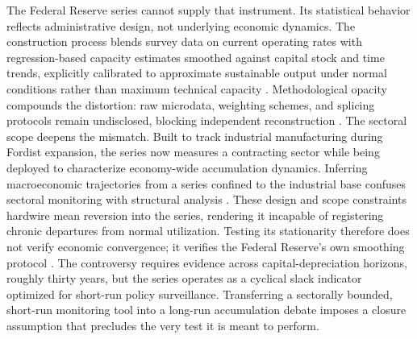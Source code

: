 \documentclass[11pt]{article}
\begin{document}
The Federal Reserve series cannot supply that instrument. Its statistical behavior reflects administrative design, not underlying economic dynamics. The construction process blends survey data on current operating rates with regression-based capacity estimates smoothed against capital stock and time trends, explicitly calibrated to approximate sustainable output under normal conditions rather than maximum technical capacity \citep{Shapiro1989}. Methodological opacity compounds the distortion: raw microdata, weighting schemes, and splicing protocols remain undisclosed, blocking independent reconstruction \citep{Shaikh2016}. The sectoral scope deepens the mismatch. Built to track industrial manufacturing during Fordist expansion, the series now measures a contracting sector while being deployed to characterize economy-wide accumulation dynamics. Inferring macroeconomic trajectories from a series confined to the industrial base confuses sectoral monitoring with structural analysis \citep{Haluska2023}. These design and scope constraints hardwire mean reversion into the series, rendering it incapable of registering chronic departures from normal utilization. Testing its stationarity therefore does not verify economic convergence; it verifies the Federal Reserve's own smoothing protocol \citep{Nikiforos2016, Nikiforos2021}. The controversy requires evidence across capital-depreciation horizons, roughly thirty years, but the series operates as a cyclical slack indicator optimized for short-run policy surveillance. Transferring a sectorally bounded, short-run monitoring tool into a long-run accumulation debate imposes a closure assumption that precludes the very test it is meant to perform.
\end{document}
